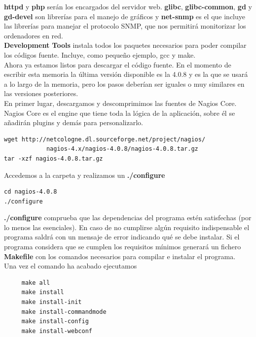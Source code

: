 \documentclass[11pt,a4paper]{article}
\begin{document}
\textbf{httpd} y \textbf{php} serán los encargados del servidor web. \textbf{glibc}, \textbf{glibc-common}, \textbf{gd} y \textbf{gd-devel} son librerías para el manejo de gráficos y \textbf{net-snmp} es el que incluye las librerías para manejar el protocolo SNMP, que nos permitirá monitorizar los ordenadores en red.
\\

\textbf{Development Tools} instala todos los paquetes necesarios para poder compilar los códigos fuente. Incluye, como pequeño ejemplo, gcc y make.
\\

Ahora ya estamos listos para descargar el código fuente. En el momento de escribir esta memoria la última versión disponible es la 4.0.8 y es la que se usará a lo largo de la memoria, pero los pasos deberían ser iguales o muy similares en las versiones posteriores.
\\

En primer lugar, descargamos y descomprimimos las fuentes de Nagios Core. Nagios Core es el engine que tiene toda la lógica de la aplicación, sobre él se añadirán plugins y demás para personalizarlo.

\begin{verbatim}
wget http://netcologne.dl.sourceforge.net/project/nagios/
            nagios-4.x/nagios-4.0.8/nagios-4.0.8.tar.gz
tar -xzf nagios-4.0.8.tar.gz
\end{verbatim}

Accedemos a la carpeta y realizamos un \textbf{./configure}

\begin{verbatim}
cd nagios-4.0.8
./configure
\end{verbatim}

\textbf{./configure} comprueba que las dependencias del programa estén satisfechas (por lo menos las esenciales). En caso de no cumplirse algún requisito indispensable el programa saldrá con un mensaje de error indicando qué se debe instalar. Si el programa considera que se cumplen los requisitos mínimos generará un fichero \textbf{Makefile} con los comandos necesarios para compilar e instalar el programa.
\\

\newpage
Una vez el comando ha acabado ejecutamos

\begin{verbatim}
     make all
     make install
     make install-init
     make install-commandmode
     make install-config
     make install-webconf
\end{verbatim}
\end{document}
